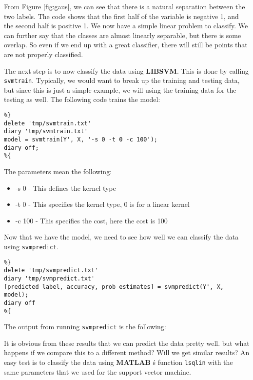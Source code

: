 \documentclass[11pt, twoside]{article}   	%
\begin{document}
From Figure  \ref{fig:gaus}, we can see that there is a natural separation between the two labels. 
The code shows that the first half of the  variable is negative 1, and the second half is positive 1. 
We now have a simple linear problem to classify. We can further say that the classes are almost
linearly separable, but there is some overlap. So even if we end up with a great classifier, there
will still be points that are not properly classified. 

The next step is to now classify the data using \textbf{LIBSVM}. This is done by calling \texttt{svmtrain}.
 Typically, we would want to break up the training and testing data, but since 
this is just a simple example, we will using the training data for the testing as well. The following code 
trains the model: 
\begin{lstlisting}
%}
delete 'tmp/svmtrain.txt'
diary 'tmp/svmtrain.txt'
model = svmtrain(Y', X, '-s 0 -t 0 -c 100');
diary off; 
%{
\end{lstlisting}

\color{lightgray}


\color{black}

The parameters mean the following: 
\begin{itemize}
\item -s 0 - This defines the kernel type
\item -t 0 - This specifies the kernel type, 0 is for a linear kernel
\item -c 100 - This specifies the cost, here the cost is 100
\end{itemize}

Now that we have the model, we need to see how well we can classify
the data using \texttt{svmpredict}. 
\begin{lstlisting}
%}
delete 'tmp/svmpredict.txt'
diary 'tmp/svmpredict.txt'
[predicted_label, accuracy, prob_estimates] = svmpredict(Y', X, model); 
diary off
%{
\end{lstlisting}

The output from running \texttt{svmpredict} is the following: 
\color{lightgray}
\color{black}

It is obvious from these results that we can predict the data pretty well. 
but what happens if we compare this to a different method? Will we get
similar results? An easy test is to classify the data using \textbf{MATLAB}
\'s function \texttt{lsqlin} with the same parameters that we used 
for the support vector machine. 
\end{document}
